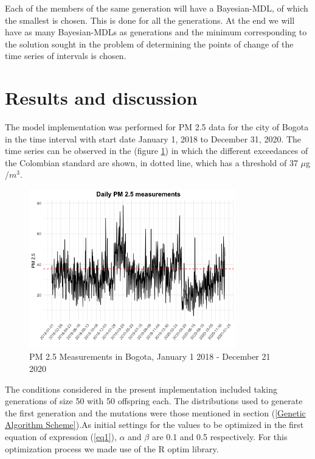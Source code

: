 \documentclass[APA,STIX1COL]{WileyNJD-v2}
\begin{document}
Each of the members of the same generation will have a Bayesian-MDL, of which the smallest is chosen. This is done for all the generations. At the end we will have as many Bayesian-MDLs as generations and the minimum corresponding to the solution sought in the problem of determining the points of change of the time series of intervals is chosen.


\section{Results and discussion}\label{sec8}

The model implementation was performed for PM 2.5 data for the city of Bogota in the time interval with start date January 1, 2018 to December 31, 2020. The time series can be observed in the (figure \ref{fig:Daily}) in which the different exceedances of the Colombian standard are shown, in dotted line, which has a threshold of 37 $\mu$g /$m^3$.

\begin{figure}[h] 
\begin{center}
\includegraphics[width=09cm]{PM25.png}
\caption{PM 2.5 Measurements in Bogota, January 1 2018 - December 21 2020}
\label{fig:Daily}
\end{center}
\end{figure}

The conditions considered in the present implementation included taking generations of size 50 with 50 offspring each. The distributions used to generate the first generation and the mutations were those mentioned in section (\ref{Genetic Algorithm Scheme}).As initial settings for the values to be optimized in the first equation of expression (\ref{eq1}), $\alpha$ and $\beta$ are 0.1 and 0.5 respectively. For this optimization process we made use of the R optim library.
\end{document}
